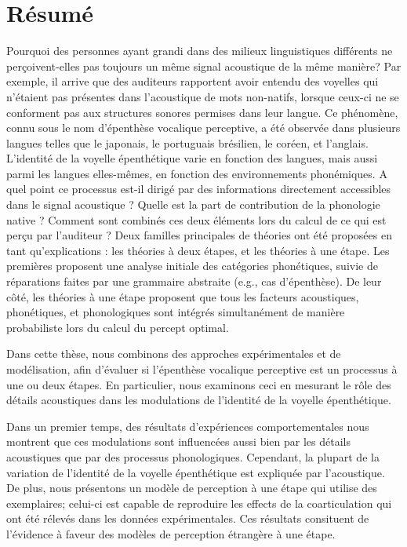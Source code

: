 \documentclass[12pt, twoside]{report}
\begin{document}
\chapter*{Résumé}
Pourquoi des personnes ayant grandi dans des milieux linguistiques différents ne perçoivent-elles pas toujours un même signal acoustique de la même manière? Par exemple, il arrive que des auditeurs rapportent avoir entendu des voyelles qui n'étaient pas présentes dans l'acoustique de mots non-natifs, lorsque ceux-ci ne se conforment pas aux structures sonores permises dans leur langue. Ce phénomène, connu sous le nom d'épenthèse vocalique perceptive, a été observée dans plusieurs langues telles que le japonais, le portuguais brésilien, le coréen, et l'anglais. L'identité de la voyelle épenthétique varie en fonction des langues, mais aussi parmi les langues elles-mêmes, en fonction des environnements phonémiques.
A quel point ce processus est-il dirigé par des informations directement accessibles dans le signal acoustique ? Quelle est la part de contribution de la phonologie native ? Comment sont combinés ces deux éléments lors du calcul de ce qui est perçu par l'auditeur ? Deux familles principales de théories ont été proposées en tant qu'explications : les théories à deux étapes, et les théories à une étape. Les premières proposent une analyse initiale des catégories phonétiques, suivie de réparations faites par une grammaire abstraite (e.g., cas d'épenthèse). De leur côté, les théories à une étape proposent que tous les facteurs acoustiques, phonétiques, et phonologiques sont intégrés simultanément de manière probabiliste lors du calcul du percept optimal.

Dans cette thèse, nous combinons des approches expérimentales et de modélisation, afin d'évaluer si l'épenthèse vocalique perceptive est un processus à une ou deux étapes. En particulier, nous examinons ceci en mesurant le rôle des détails acoustiques dans les modulations de l'identité de la voyelle épenthétique.

Dans un premier temps, des résultats d'expériences comportementales nous montrent que ces modulations sont influencées aussi bien par les détails acoustiques que par des processus phonologiques. Cependant, la plupart de la variation de l'identité de la voyelle épenthétique est expliquée par l'acoustique. De plus, nous présentons un modèle de perception à une étape qui utilise des exemplaires; celui-ci est capable de reproduire les effects de la coarticulation qui ont été rélevés dans les données expérimentales. Ces résultats consituent de l'évidence à faveur des modèles de perception étrangère à une étape.    
\end{document}
